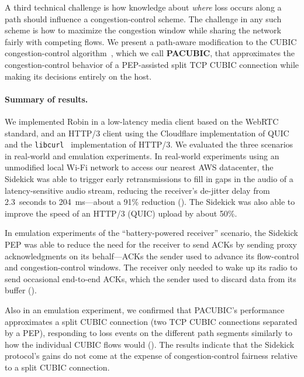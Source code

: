 \smallskip

A third technical challenge is how knowledge about \emph{where}
loss occurs along a path should influence a congestion-control scheme.
The challenge in any such scheme is how to maximize the congestion window
while sharing the network fairly with competing flows.
We present a path-aware modification to the CUBIC congestion-control
algorithm~\cite{ha2008cubic}, which we call \mbox{\textbf{PACUBIC}},
that approximates the congestion-control behavior of a PEP-assisted split TCP
CUBIC connection while making its decisions entirely on the host.

\paragraph{Summary of results.}

We implemented Robin in a low-latency media client
based on the WebRTC standard, and an HTTP/3 client using the Cloudflare
implementation of QUIC~\cite{quiche} and the \texttt{libcurl}~\cite{libcurl}
implementation of HTTP/3. We evaluated the three scenarios in
real-world and emulation experiments.
In real-world experiments using an unmodified local Wi-Fi network to access our
nearest AWS datacenter, the Sidekick was able to trigger early retransmissions
to fill in gaps in the audio of a latency-sensitive audio stream, reducing the
receiver's de-jitter delay from 2.3~seconds to 204~ms---about a 91\% reduction
(). The Sidekick was also able to improve the speed of an
HTTP/3 (QUIC) upload by about 50\%.

In emulation experiments of the ``battery-powered receiver'' scenario,
the Sidekick PEP was able to reduce the need for the receiver to send ACKs
by sending proxy acknowledgments on its behalf---ACKs the sender used
to advance its flow-control and congestion-control windows. The
receiver only needed to wake up its radio to send occasional
end-to-end ACKs, which the sender used to discard data from its
buffer ().

Also in an emulation experiment, we confirmed that PACUBIC's
performance approximates a split CUBIC connection (two TCP CUBIC
connections separated by a PEP), responding to loss events on the
different path segments similarly to how the individual CUBIC flows would
(). The results indicate that the Sidekick protocol's gains
do not come at the
expense of congestion-control fairness relative to a split CUBIC connection.

